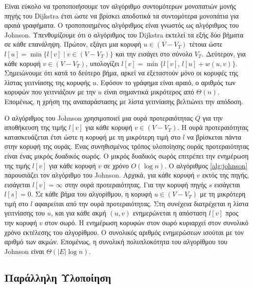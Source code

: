 \documentclass[12pt,a4paper]{article} %
\begin{document}
{{Είναι εύκολο να τροποποιήσουμε τον αλγόριθμο συντομότερων μονοπατιών
μονής πηγής του Dijkstra έτσι ώστε να βρίσκει αποδοτικά τα συντομότερα
μονοπάτια για αραιά γραφήματα. Ο τροποποιημένος αλγόριθμος είναι γνωστός
ως αλγόριθμος του Johnson. Υπενθυμίζουμε ότι ο αλγόριθμος του Dijkstra
εκτελεί τα εξής δύο βήματα σε κάθε επανάληψη. Πρώτον, εξάγει μια κορυφή
$u \in (V - V_T)$ τέτοια ώστε $l[u] = \min\{l[v] \mid v \in (V - V_T)\}$
και την εισάγει στο σύνολο $V_T$. Δεύτερον, για κάθε κορυφή
$v \in (V - V_T)$, υπολογίζει \mbox{$l[v] = \min\{l[v],\, l[u] + w(u, v)\}$}.
Σημειώνουμε ότι κατά το δεύτερο βήμα, αρκεί να εξεταστούν μόνο οι
κορυφές της λίστας γειτνίασης της κορυφής $u$. Εφόσον το γράφημα είναι
αραιό, ο αριθμός των κορυφών που γειτνιάζουν με την $u$ είναι
σημαντικά μικρότερος από $\Theta(n)$. Επομένως, η χρήση της
αναπαράστασης με λίστα γειτνίασης βελτιώνει την απόδοση.

Ο αλγόριθμος του Johnson χρησιμοποιεί μια ουρά προτεραιότητας $Q$
για την αποθήκευση της τιμής $l[v]$ για κάθε κορυφή $v \in (V - V_T)$.
Η ουρά προτεραιότητας κατασκευάζεται έτσι ώστε η κορυφή με τη μικρότερη
τιμή στο $l$ να βρίσκεται πάντα στην κορυφή της ουράς. Ένας συνηθισμένος
τρόπος υλοποίησης ουράς προτεραιότητας είναι ένας μικρός δυαδικός σωρός.
Ο μικρός δυαδικός σωρός επιτρέπει την ενημέρωση της τιμής $l[v]$ για
κάθε κορυφή $v$ σε χρόνο $O(\log n)$. Ο αλγόριθμος \ref{alg:johnson} παρουσιάζει
τον αλγόριθμο του Johnson. Αρχικά, για κάθε κορυφή $v$ εκτός της πηγής,
εισάγεται $l[v] = \infty$ στην ουρά προτεραιότητας. Για την κορυφή
πηγής $s$ εισάγεται $l[s] = 0$. Σε κάθε βήμα του αλγορίθμου, η κορυφή
\mbox{$u \in (V - V_T)$} με τη μικρότερη τιμή στο $l$ αφαιρείται από την ουρά
προτεραιότητας. Στη συνέχεια διατρέχεται η λίστα γειτνίασης του $u$,
και για κάθε ακμή $(u, v)$ ενημερώνεται η απόσταση $l[v]$ προς την
κορυφή $v$ στον σωρό. Η ενημέρωση κορυφών στον σωρό κυριαρχεί στον
συνολικό χρόνο εκτέλεσης του αλγορίθμου. Ο συνολικός αριθμός ενημερώσεων
ισούται με τον αριθμό των ακμών. Eπομένως, η συνολική πολυπλοκότητα
του αλγορίθμου του Johnson είναι $\Theta(|E| \log n)$.

\subsection*{Παράλληλη Υλοποίηση}

}}
\end{document}
